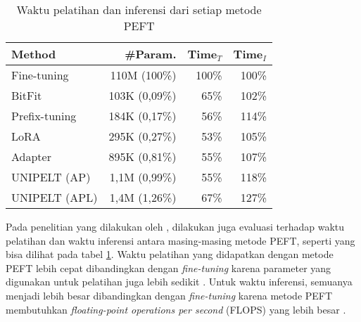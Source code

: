 \begin{table}[ht]
    \vspace{0.25cm}
    \centering
    \caption{Waktu pelatihan dan inferensi dari setiap metode PEFT \parencite{unipelt}}
    \label{table:runtime-peft}
    \begin{tabular}{lrrr}
        \toprule
        \textbf{Method} & \textbf{\#Param.} & \textbf{Time$_T$} & \textbf{Time$_I$} \\ 
        \midrule
        Fine-tuning & 110M (100\%) & 100\% & 100\% \\ 
        BitFit & 103K (0,09\%) & 65\% & 102\% \\ 
        Prefix-tuning & 184K (0,17\%) & 56\% & 114\% \\ 
        LoRA & 295K (0,27\%) & 53\% & 105\% \\ 
        Adapter & 895K (0,81\%) & 55\% & 107\% \\ 
        UNIPELT (AP) & 1,1M (0,99\%) & 55\% & 118\% \\ 
        UNIPELT (APL) & 1,4M (1,26\%) & 67\% & 127\% \\ 
        \bottomrule
    \end{tabular}
\end{table}

Pada penelitian yang dilakukan oleh \citeauthor{unipelt}, dilakukan juga evaluasi terhadap waktu pelatihan dan waktu inferensi antara masing-masing metode PEFT, seperti yang bisa dilihat pada tabel \ref{table:runtime-peft}. Waktu pelatihan yang didapatkan dengan metode PEFT lebih cepat dibandingkan dengan \textit{fine-tuning} karena parameter yang digunakan untuk pelatihan juga lebih sedikit \parencite{unipelt}. Untuk waktu inferensi, semuanya menjadi lebih besar dibandingkan dengan \textit{fine-tuning} karena metode PEFT membutuhkan \textit{floating-point operations per second} (FLOPS) yang lebih besar \parencite{unipelt}.
